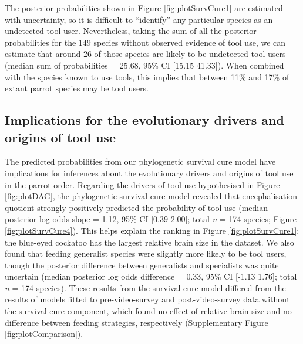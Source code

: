 \documentclass[
  man,floatsintext]{apa6}
\begin{document}
The posterior probabilities shown in Figure \ref{fig:plotSurvCure1} are estimated with uncertainty, so it is difficult to ``identify'' any particular species as an undetected tool user. Nevertheless, taking the sum of all the posterior probabilities for the 149 species without observed evidence of tool use, we can estimate that around 26 of those species are likely to be undetected tool users (median sum of probabilities = 25.68, 95\% CI {[}15.15 41.33{]}). When combined with the species known to use tools, this implies that between 11\% and 17\% of extant parrot species may be tool users.

\hypertarget{implications-for-the-evolutionary-drivers-and-origins-of-tool-use}{%
\subsection{Implications for the evolutionary drivers and origins of tool use}\label{implications-for-the-evolutionary-drivers-and-origins-of-tool-use}}

The predicted probabilities from our phylogenetic survival cure model have implications for inferences about the evolutionary drivers and origins of tool use in the parrot order. Regarding the drivers of tool use hypothesised in Figure \ref{fig:plotDAG}, the phylogenetic survival cure model revealed that encephalisation quotient strongly positively predicted the probability of tool use (median posterior log odds slope = 1.12, 95\% CI {[}0.39 2.00{]}; total \emph{n} = 174 species; Figure \ref{fig:plotSurvCure4}). This helps explain the ranking in Figure \ref{fig:plotSurvCure1}: the blue-eyed cockatoo has the largest relative brain size in the dataset. We also found that feeding generalist species were slightly more likely to be tool users, though the posterior difference between generalists and specialists was quite uncertain (median posterior log odds difference = 0.33, 95\% CI {[}-1.13 1.76{]}; total \emph{n} = 174 species). These results from the survival cure model differed from the results of models fitted to pre-video-survey and post-video-survey data without the survival cure component, which found no effect of relative brain size and no difference between feeding strategies, respectively (Supplementary Figure \ref{fig:plotComparison}).
\end{document}
